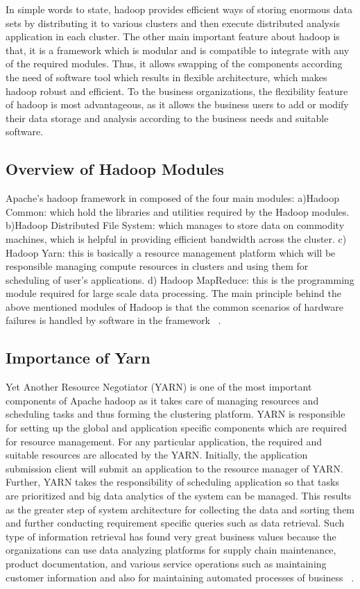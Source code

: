 In simple words to state, hadoop provides efficient ways of storing enormous 
data sets by distributing it to various clusters and then execute distributed 
analysis application in each cluster. The other main important feature about 
hadoop is that, it is a framework which is modular and is compatible to 
integrate with any of the required modules. Thus, it allows swapping of the 
components according the need of software tool which results in flexible 
architecture, which makes hadoop robust and efficient. To the business 
organizations, the flexibility feature of hadoop is most advantageous, as it 
allows the business users to add or modify their data storage and analysis  
according to the business needs and suitable software.


\subsection{Overview of Hadoop Modules}
Apache's hadoop framework in composed of the four main modules: 
a)Hadoop Common: which hold the libraries and utilities required by the Hadoop 
modules.
b)Hadoop Distributed File System: which manages to store data on commodity 
machines, which is helpful in providing efficient bandwidth across the cluster.
c) Hadoop Yarn: this is basically a resource management platform which will be 
responsible managing compute resources in clusters and using them for scheduling
of user's applications.
d) Hadoop MapReduce: this is the programming module required for large scale 
data processing.
The main principle behind the above mentioned modules of Hadoop is that the 
common scenarios of  hardware failures is handled by software in the framework
~\cite{hid-sp18-406-hadoop-intro5}.

\subsection{Importance of Yarn}
Yet Another Resource Negotiator (YARN) is one of the most important components 
of Apache hadoop as it takes care of managing resources and scheduling tasks and
thus forming the clustering platform. YARN is responsible for setting up the 
global and application specific components which are required for resource 
management. For any particular application, the required and suitable resources 
are allocated by the YARN. Initially, the application submission client will 
submit an application to the resource manager of YARN. Further, YARN takes the 
responsibility of scheduling application so that tasks are prioritized and big 
data analytics of the system can be managed. This results as the greater step 
of system architecture for collecting the data and sorting them and further 
conducting requirement specific queries such as data retrieval. Such type of 
information retrieval has found very great business values because the 
organizations can use data analyzing platforms for supply chain maintenance, 
product documentation, and various service operations such as maintaining 
customer information and also for maintaining automated processes of business
~\cite{hid-sp18-406-hadoop-intro6}.

